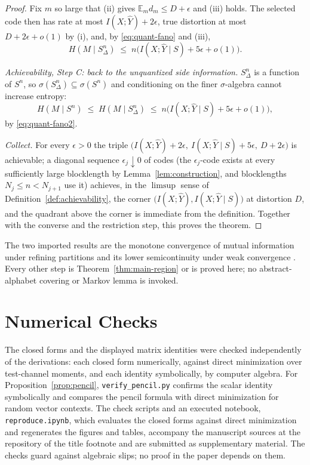 \documentclass[11pt,onecolumn]{IEEEtran}
\newcommand{\E}{\mathbb{E}}
\newcommand{\hY}{\widehat{Y}}
\begin{document}
\begin{proof}
Fix $m$ so large that (ii) gives $\E_m d_m\le D+\epsilon$ and (iii)
holds. The selected code then has rate at most $I(X;\hY)+2\epsilon$,
true distortion at most $D+2\epsilon+o(1)$ by (i), and, by
\eqref{eq:quant-fano} and (iii),
\begin{equation}
H(M\mid S_\Delta^n)\;\le\;n\bigl(I(X;\hY\mid S)+5\epsilon+o(1)\bigr).
\label{eq:quant-fano2}
\end{equation}

\emph{Achievability, Step C: back to the unquantized side information.}
$S_\Delta^n$ is a function of $S^n$, so
$\sigma(S_\Delta^n)\subseteq\sigma(S^n)$ and conditioning on the finer
$\sigma$-algebra cannot increase entropy:
\begin{equation}
H(M\mid S^n)\;\le\;H(M\mid S_\Delta^n)
\;\le\;n\bigl(I(X;\hY\mid S)+5\epsilon+o(1)\bigr),
\label{eq:quant-back}
\end{equation}
by \eqref{eq:quant-fano2}.

\emph{Collect.} For every $\epsilon>0$ the triple
$\bigl(I(X;\hY)+2\epsilon,\ I(X;\hY\mid S)+5\epsilon,\
D+2\epsilon\bigr)$ is achievable; a diagonal sequence
$\epsilon_j\downarrow0$ of codes (the $\epsilon_j$-code exists at every
sufficiently large blocklength by Lemma~\ref{lem:construction}, and
blocklengths $N_j\le n<N_{j+1}$ use it) achieves, in the $\limsup$ sense
of Definition~\ref{def:achievability}, the corner
$\bigl(I(X;\hY),I(X;\hY\mid S)\bigr)$ at distortion $D$, and the
quadrant above the corner is immediate from the definition. Together
with the converse and the restriction step, this proves the theorem.
\end{proof}

The two imported results are the monotone convergence of mutual
information under refining partitions \cite[Ch.~2]{pinsker1964} and its
lower semicontinuity under weak convergence \cite{posner1975}. Every
other step is Theorem~\ref{thm:main-region} or is proved here; no
abstract-alphabet covering or Markov lemma is invoked.

\section{Numerical Checks}
\label{app:numver}

The closed forms and the displayed matrix identities were checked
independently of the derivations: each closed form numerically, against
direct minimization over test-channel moments, and each identity
symbolically, by computer algebra. For Proposition~\ref{prop:pencil},
\texttt{verify\_pencil.py} confirms the scalar identity symbolically and
compares the pencil formula with direct minimization for random vector
contexts. The check scripts and an executed
notebook, \texttt{reproduce.ipynb}, which evaluates the closed forms
against direct minimization and regenerates the figures and tables,
accompany the manuscript sources at the repository of the title footnote
and are submitted as supplementary material. The checks guard against
algebraic slips; no proof in the paper depends on them.
\end{document}
